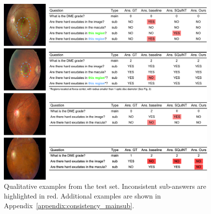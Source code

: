 \begin{figure}[!t]
\begin{center}
\includegraphics[width=0.99\textwidth]{Figures/Part2_Consist/01_mainsub/examples_expl_marked_add.pdf}
\caption{Qualitative examples from the test set. Inconsistent sub-answers are highlighted in red. Additional examples are shown in Appendix~\ref{appendix:consistency_mainsub}.  
}
\label{fig:examples}
\end{center}
\end{figure}


